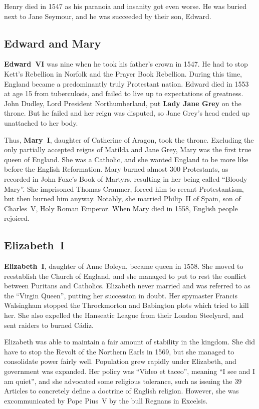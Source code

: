 Henry died in 1547 as his paranoia and insanity got even worse.
He was buried next to Jane Seymour, and he was succeeded by their son, Edward.

\subsection*{Edward and Mary}

\textbf{Edward~VI} was nine when he took his father's crown in 1547.
He had to stop Kett's Rebellion in Norfolk and the Prayer Book Rebellion.
During this time, England became a predominantly truly Protestant nation.
Edward died in 1553 at age 15 from tuberculosis, and failed to live up to expectations of greatness.
John Dudley, Lord President Northumberland, put \textbf{Lady Jane Grey} on the throne.
But he failed and her reign was disputed, so Jane Grey's head ended up unattached to her body.

Thus, \textbf{Mary~I}, daughter of Catherine of Aragon, took the throne.
Excluding the only partially accepted reigns of Matilda and Jane Grey, Mary was the first true queen of England.
She was a Catholic, and she wanted England to be more like before the English Reformation.
Mary burned almost 300 Protestants, as recorded in John Foxe's Book of Martyrs,
resulting in her being called ``Bloody Mary''.
She imprisoned Thomas Cranmer, forced him to recant Protestantism, but then burned him anyway.
Notably, she married Philip~II of Spain, son of Charles~V, Holy Roman Emperor.
When Mary died in 1558, English people rejoiced.

\subsection*{Elizabeth~I}

\textbf{Elizabeth~I}, daughter of Anne Boleyn, became queen in 1558.
She moved to reestablish the Church of England,
and she managed to put to rest the conflict between Puritans and Catholics.
Elizabeth never married and was referred to as the ``Virgin Queen'', putting her succession in doubt.
Her spymaster Francis Walsingham stopped the Throckmorton and Babington plots which tried to kill her.
She also expelled the Hanseatic League from their London Steelyard, and sent raiders to burned C\'a{}diz.

Elizabeth was able to maintain a fair amount of stability in the kingdom.
She did have to stop the Revolt of the Northern Earls in 1569,
but she managed to consolidate power fairly well.
Population grew rapidly under Elizabeth, and government was expanded.
Her policy was ``Video et taceo'', meaning ``I see and I am quiet'',
and she advocated some religious tolerance,
such as issuing the 39 Articles to concretely define a doctrine of English religion.
However, she was excommunicated by Pope Pius~V by the bull Regnans in Excelsis.

